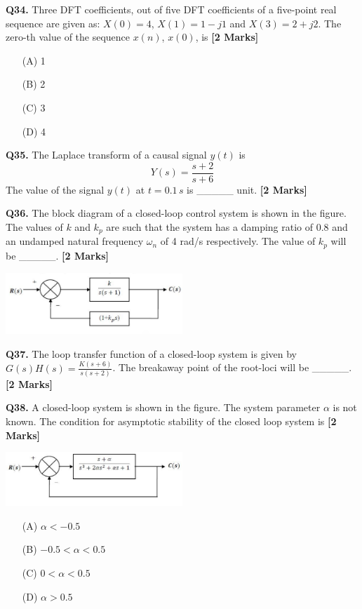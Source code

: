 \documentclass[11pt]{article}
\newcommand{\questionb}[2]{
    \noindent\textbf{Q#2.} #1 \hfill \textbf{[2 Marks]}
}
\begin{document}
\questionb{Three DFT coefficients, out of five DFT coefficients of a five-point real sequence are given as:  
\( X(0) = 4 \), \( X(1) = 1 - j1 \) and \( X(3) = 2 + j2 \). The zero-th value of the sequence \( x(n) \), \( x(0) \), is}{34}
\begin{enumerate}
    \item[(A)] 1  
    \item[(B)] 2  
    \item[(C)] 3  
    \item[(D)] 4  
\end{enumerate}
\vspace{0.5cm}

\questionb{The Laplace transform of a causal signal \( y(t) \) is  
\[ Y(s) = \frac{s+2}{s+6} \]  
The value of the signal \( y(t) \) at \( t = 0.1 \, s \) is \_\_\_\_\_ unit.}{35}
\vspace{0.5cm}

\questionb{The block diagram of a closed-loop control system is shown in the figure. The values of \( k \) and \( k_p \) are such that the system has a damping ratio of 0.8 and an undamped natural frequency \(\omega_n\) of 4 rad/s respectively. The value of \( k_p \) will be \_\_\_\_\_.}{36}
\begin{center}
\includegraphics[width=0.5\textwidth]{figures/36.png}
\end{center}
\vspace{0.5cm}

\questionb{The loop transfer function of a closed-loop system is given by \( G(s)H(s) = \frac{K(s + 6)}{s(s + 2)} \). The breakaway point of the root-loci will be \_\_\_\_\_.}{37}
\vspace{0.5cm}

\questionb{A closed-loop system is shown in the figure. The system parameter \( \alpha \) is not known. The condition for asymptotic stability of the closed loop system is}{38}
\begin{center}
\includegraphics[width=0.5\textwidth]{figures/38.png}
\end{center}
\begin{enumerate}
    \item[(A)] \( \alpha < -0.5 \)  
    \item[(B)] \( -0.5 < \alpha < 0.5 \)  
    \item[(C)] \( 0 < \alpha < 0.5 \)  
    \item[(D)] \( \alpha > 0.5 \)
\end{enumerate}
\vspace{0.5cm}
\end{document}
